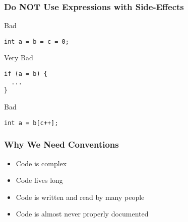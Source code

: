 \documentclass[screen]{beamer}
\begin{document}
\begin{frame}[fragile]
\frametitle{Do NOT Use Expressions with Side-Effects}%
\begin{alertblock}{Bad}
\begin{lstlisting}
int a = b = c = 0;
\end{lstlisting}
\end{alertblock}

\begin{alertblock}{Very Bad}
\begin{lstlisting}
if (a = b) {
  ...
}
\end{lstlisting}

\begin{alertblock}{Bad}
\begin{lstlisting}
int a = b[c++];
\end{lstlisting}
\end{alertblock}
\end{alertblock}
\end{frame}


\begin{frame}[fragile]
\frametitle{Why We Need Conventions}%
\begin{itemize}[<+->]
	\item Code is complex
	\item Code lives long
	\item Code is written and read by many people
	\item Code is almost never properly documented
\end{itemize}
\end{frame}


\end{document}
